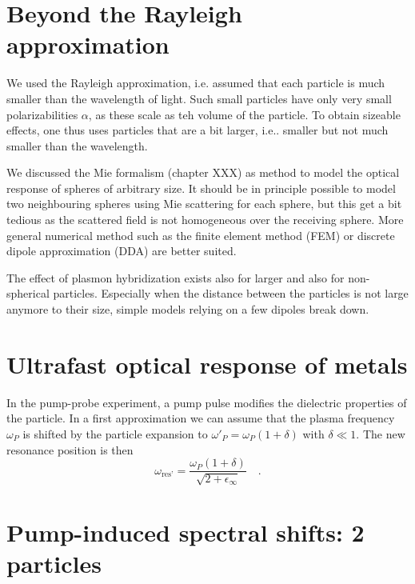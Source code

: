\section{Beyond the Rayleigh approximation}

We used the Rayleigh approximation, i.e. assumed that each particle is much smaller than the wavelength of light. Such small particles have only very small polarizabilities $\alpha$, as these scale as teh volume of the particle. To obtain sizeable effects, one thus uses particles that are a bit larger, i.e.. smaller but not much smaller than the wavelength. 

We discussed the Mie formalism (chapter XXX) as method to model the optical response of spheres of arbitrary size. It should be in principle possible to model two neighbouring spheres using Mie scattering for each sphere, but this get a bit tedious as the scattered field is not homogeneous over the receiving sphere. More general numerical method such as the finite element method (FEM) or discrete dipole approximation (DDA) are better suited.

The effect of plasmon hybridization exists also for larger and also for non-spherical particles. Especially when the distance between the particles is not large anymore to their size, simple models relying on a few dipoles break down.


\section{Ultrafast optical response of metals}



In the pump-probe experiment, a pump pulse modifies the dielectric properties of
the particle. In a first approximation we can assume that the plasma frequency
$\omega_P$ is shifted by the particle expansion to $\omega'_P = \omega_P (1 +
\delta)$ with $\delta \ll 1$. The new resonance position is then
%
\begin{equation} \label{eq:omega_equal}
 \omega_{\text{res'}} = \frac{\omega_P (1 + \delta)}{\sqrt{2 +
\epsilon_{\infty}} }  \quad .
\end{equation}




\section{Pump-induced spectral shifts: 2 particles}



